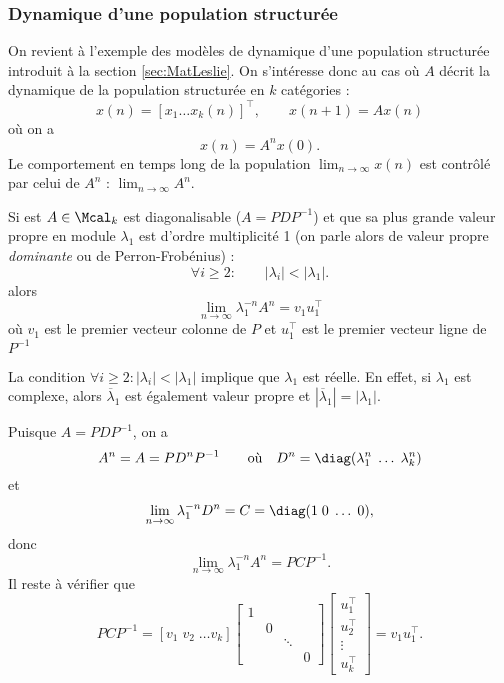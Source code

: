 \subsubsection{Dynamique d'une population structurée}

On revient à l'exemple des modèles de dynamique d'une population structurée introduit à la section \ref{sec:MatLeslie}. On s'intéresse donc au cas où $A$ décrit la dynamique de la population structurée en $k$ catégories : 
$$
x(n) = [x_1 \dots x_k(n)]^\top, \qquad x(n+1) = A x(n)
$$
où on a
$$
x(n) = A^n x(0).
$$
Le comportement en temps long de la population $\lim_{n \to\infty} x(n)$ est contrôlé par celui de $A^n$ : $\lim_{n \to\infty} A^n$.

\begin{proposition}
  Si est $A \in \Mcal_k$ est diagonalisable ($A = P D P^{-1}$) et que sa plus grande valeur propre en module $\lambda_1$ est d'ordre multiplicité 1 (on parle alors de valeur propre {\em dominante} ou de Perron-Frobénius) :
  $$
  \forall i \geq 2: \qquad |\lambda_i| < |\lambda_1|.
  $$
  alors
  $$
  \lim_{n \to \infty} \lambda_1^{-n} A^n = v_1 u_1^\top
  $$
  où $v_1$ est le premier vecteur colonne de $P$ et $u_1^\top$ est le premier vecteur ligne de $P^{-1}$
\end{proposition}

\remark
La condition $\forall i \geq 2: |\lambda_i| < |\lambda_1|$ implique que $\lambda_1$ est réelle. En effet, si $\lambda_1$ est complexe, alors $\overline{\lambda}_1$ est également valeur propre et $|\overline{\lambda}_1| = |\lambda_1|$.

\proof
  Puisque $A = P D P^{-1}$, on a
  $$
  A^n = A = P D^n P^{-1}
  \qquad \text{où} \quad 
  D^n = \diag(\lambda_1^n \; \dots \; \lambda_k^n)
  $$
  et 
  $$
  \lim_{n \to \infty} \lambda_1^{-n} D^n = C = \diag(1 \; 0 \; \dots \; 0),
  $$
  donc
  $$
  \lim_{n \to \infty} \lambda_1^{-n} A^n = P C P^{-1}.
  $$
  Il reste à vérifier que
  $$
  P C P^{-1} 
  = \left[v_1 \; v_2 \; \dots v_k\right] 
  \left[\begin{array}{cccc} 1 & & & \\ & 0 & & \\ & & \ddots & \\ & & & 0 \end{array} \right] 
  \left[\begin{array}{c} u_1^\top \\ u_2^\top \\ \vdots \\ u_k^\top \end{array}\right] 
  = v_1 u_1^\top .
  $$
\eproof

